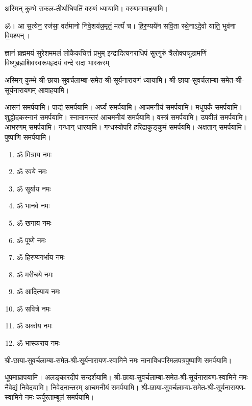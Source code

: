 अस्मिन् कुम्भे सकल-तीर्थाधिपतिं वरुणं ध्यायामि। वरुणमावाहयामि।

ॐ। आ स॒त्येन॒ रज॑सा॒ वर्त॑मानो निवे॒शय॑न्न॒मृतं॒ मर्त्यं॑ च। हि॒र॒ण्यये॑न सवि॒ता रथे॒नाऽदे॒वो या॑ति॒ भुव॑ना वि॒पश्यन्। 

{ज्ञानं ब्रह्ममयं सुरेशममलं लोकैकचित्तं प्रभुम्}
{इन्द्रादित्यनराधिपं सुरगुरुं त्रैलोक्यचूडामणिं}
{विष्णुब्रह्मशिवस्वरूपहृदयं वन्दे सदा भास्करम्}

अस्मिन् कुम्भे श्री-छाया-सुवर्चलाम्बा-समेत-श्री-सूर्यनारायणं ध्यायामि। श्री-छाया-सुवर्चलाम्बा-समेत-श्री-सूर्यनारायणम् आवाहयामि।

आसनं समर्पयामि। पाद्यं समर्पयामि। अर्घ्यं समर्पयामि। आचमनीयं समर्पयामि। मधुपर्कं समर्पयामि। शुद्धोदकस्नानं समर्पयामि। स्नानानन्तरं आचमनीयं समर्पयामि। वस्त्रं समर्पयामि। उपवीतं समर्पयामि। आभरणम् समर्पयामि। गन्धान् धारयामि। गन्धस्योपरि हरिद्राकुङ्कुमं समर्पयमि। अक्षतान् समर्पयामि। पुष्पाणि समर्पयामि।


\begin{multicols}{2}
\begin{enumerate}
\item ॐ मित्राय नमः
\item ॐ रवये नमः
\item ॐ सूर्याय नमः
\item ॐ भानवे नमः
\item ॐ खगाय नमः
\item ॐ पूष्णे नमः
\item ॐ हिरण्यगर्भाय नमः
\item ॐ मरीचये नमः
\item ॐ आदित्याय नमः
\item ॐ सवित्रे नमः
\item ॐ अर्काय नमः
\item ॐ भास्कराय नमः

\end{enumerate}
\end{multicols}

 श्री-छाया-सुवर्चलाम्बा-समेत-श्री-सूर्यनारायण-स्वामिने नमः नानाविध\-परिमल\-पत्र\-पुष्पाणि समर्पयामि।


\renewcommand{\devAya}{श्री-छाया-सुवर्चलाम्बा-समेत-श्री-सूर्यनारायण-स्वामिने नमः}

धूपमाघ्रापयामि। अलङ्कारदीपं सन्दर्शयामि।
\devAya{} नैवेद्यं निवेदयामि। निवेदनान्तरम् आचमनीयं समर्पयामि।
\devAya{} कर्पूरताम्बूलं समर्पयामि।


